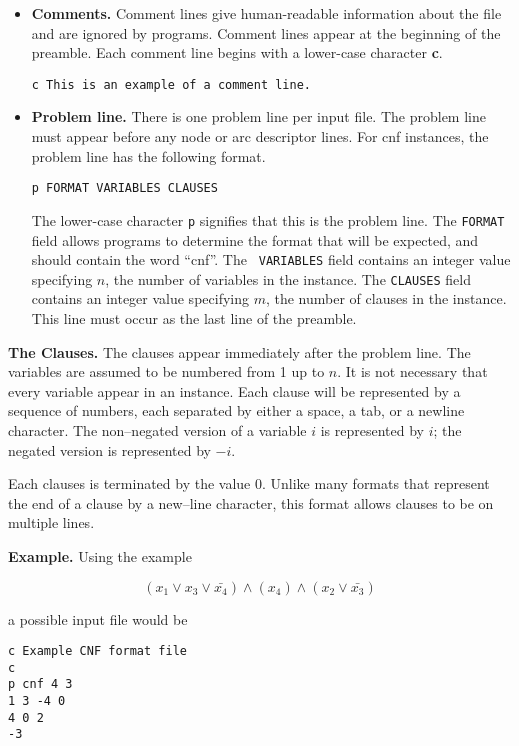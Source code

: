 \begin{itemize}
\item {\bf Comments.} Comment lines give human-readable 
information about the file and are ignored by programs.  Comment lines
appear at the beginning of the preamble.  Each comment line begins with a
lower-case character {\bf c}.
\begin{verbatim} 
c This is an example of a comment line.
\end{verbatim} 

\item {\bf Problem line.}  There is one problem line per input file.  The 
problem line must appear before any node or arc descriptor lines.  For
cnf instances, the problem line has the following format.
\begin{verbatim}
p FORMAT VARIABLES CLAUSES
\end{verbatim} 

The lower-case character {\tt p} signifies that this is the problem
line.  The {\tt FORMAT} field allows programs to determine the format
that will be expected, and should contain the word ``cnf''.  The {\tt
VARIABLES} field contains an integer value specifying $n$, the number
of variables in the instance.  The {\tt CLAUSES} field contains an
integer value specifying $m$, the number of clauses in the instance.
This line must occur as the last line of the preamble.

\end{itemize}

{\bf The Clauses.}  The clauses appear immediately after the problem
line.  The variables are assumed to be numbered from 1 up to $n$.  It
is not necessary that every variable appear in an instance.
Each clause will be represented by a sequence of numbers, each
separated by either a space, a tab, or a newline character.  The
non--negated version of a variable $i$ is represented by $i$;  the
negated version is represented by $-i$.

Each clauses is terminated by the value 0.  Unlike many formats that
represent the end of a clause by a new--line character, this format
allows clauses to be on multiple lines. 

\bigskip
{\bf Example.}  Using the example 

$$(x_1\vee x_3\vee \bar{x_4})\wedge (x_4)\wedge (x_2\vee \bar{x_3})$$

\noindent a possible input file would be

\begin{verbatim}
c Example CNF format file
c
p cnf 4 3
1 3 -4 0
4 0 2
-3
\end{verbatim}

